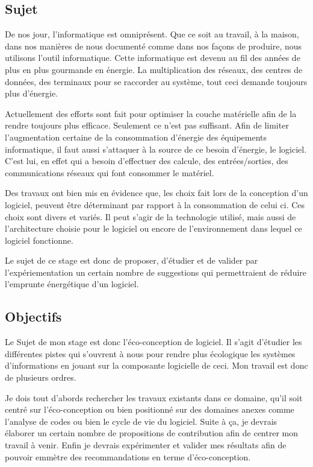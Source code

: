 \documentclass[a4paper, 11pt]{report}
\begin{document}
\subsection{Sujet}
De nos jour, l'informatique est omniprésent. Que ce soit au travail, à la maison, dans nos manières de nous documenté comme dans nos façons de produire, nous utilisons l'outil informatique. Cette informatique est devenu au fil des années de plus en plus gourmande en énergie. La multiplication des réseaux, des centres de données, des terminaux pour se raccorder au système, tout ceci demande toujours plus d'énergie.

Actuellement des efforts sont fait pour optimiser la couche matérielle afin de la rendre toujours plus efficace. Seulement ce n'est pas suffisant. Afin de limiter l'augmentation certaine de la consommation d'énergie des équipements informatique, il faut aussi s'attaquer à la source de ce besoin d'énergie, le logiciel. C'est lui, en effet qui a besoin d'effectuer des calcule, des entrées/sorties, des communications réseaux qui font consommer le matériel.

Des travaux ont bien mis en évidence que, les choix fait lors de la conception d'un logiciel, peuvent être déterminant par rapport à la consommation de celui ci. Ces choix sont divers et variés. Il peut s'agir de la technologie utilisé, mais aussi de l'architecture choisie pour le logiciel ou encore de l'environnement dans lequel ce logiciel fonctionne.

Le sujet de ce stage est donc de proposer, d'étudier et de valider par l'expériementation un certain nombre de suggestions qui permettraient de réduire l'emprunte énergétique d'un logiciel.

\subsection{Objectifs}
Le Sujet de mon stage est donc l'éco-conception de logiciel. Il s'agit d'étudier les différentes pistes qui s'ouvrent à nous pour rendre plus écologique les systèmes d'informations en jouant sur la composante logicielle de ceci. Mon travail est donc de plusieurs ordres.

Je dois tout d'abords rechercher les travaux existants dans ce domaine, qu'il soit centré sur l'éco-conception ou bien positionné sur des domaines anexes comme l'analyse de codes ou bien le cycle de vie du logiciel. Suite à ça, je devrais élaborer un certain nombre de propositions de contribution afin de centrer mon travail à venir. Enfin je devrais expérimenter et valider mes résultats afin de pouvoir emmètre des recommandations en terme d'éco-conception.
\end{document}

